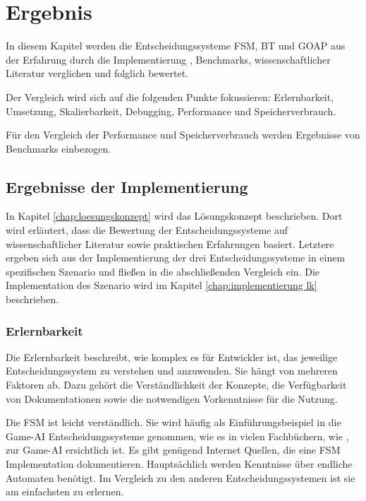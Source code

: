 \chapter{Ergebnis}
\label{chap:ergebnis}

In diesem Kapitel werden die Entscheidungssysteme FSM, BT und GOAP aus der Erfahrung durch die Implementierung \autocite{oleg}, Benchmarks, wissenschaftlicher Literatur verglichen und folglich bewertet.

Der Vergleich wird sich auf die folgenden Punkte fokussieren: Erlernbarkeit, Umsetzung, Skalierbarkeit, Debugging, Performance und Speicherverbrauch. 

F\"{u}r den Vergleich der Performance und Speicherverbrauch werden Ergebnisse von Benchmarks einbezogen.

\section{Ergebnisse der Implementierung}

In Kapitel \ref{chap:loesungskonzept} wird das L\"{o}sungskonzept beschrieben. Dort wird erl\"{a}utert, dass die Bewertung der Entscheidungssysteme auf wissenschaftlicher Literatur sowie praktischen Erfahrungen basiert. Letztere ergeben sich aus der Implementierung der drei Entscheidungssysteme in einem spezifischen Szenario und flie\ss{}en in die abschlie\ss{}enden Vergleich ein. Die Implementation des Szenario wird im Kapitel \ref{chap:implementierung lk} beschrieben.


\subsection{Erlernbarkeit}
\label{chap:erlernbarkeit}

Die Erlernbarkeit beschreibt, wie komplex es f\"{u}r Entwickler ist, das jeweilige Entscheidungssystem zu verstehen und anzuwenden. Sie h\"{a}ngt von mehreren Faktoren ab. Dazu geh\"{o}rt die Verst\"{a}ndlichkeit der Konzepte, die Verf\"{u}gbarkeit von Dokumentationen sowie die notwendigen Vorkenntnisse f\"{u}r die Nutzung.

Die FSM ist leicht verst\"{a}ndlich. Sie wird h\"{a}ufig als Einf\"{u}hrungsbeispiel in die Game-AI Entscheidungssysteme genommen, wie es in vielen Fachb\"{u}chern, wie \autocite{AIgames, aiag}, zur Game-AI ersichtlich ist. Es gibt gen\"{u}gend Internet Quellen, die eine FSM Implementation dokumentieren. Haupts\"{a}chlich werden Kenntnisse \"{u}ber endliche Automaten ben\"{o}tigt. Im Vergleich zu den anderen Entscheidungssystemen ist sie am einfachsten zu erlernen.

